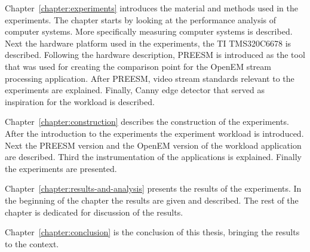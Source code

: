 Chapter~\ref{chapter:experiments} introduces the material and methods used in the experiments. The chapter starts by looking at the performance analysis of computer systems. More specifically measuring computer systems is described. Next the hardware platform used in the experiments, the TI TMS320C6678 is described. Following the hardware description, PREESM is introduced as the tool that was used for creating the comparison point for the OpenEM stream processing application. After PREESM, video stream standards relevant to the experiments are explained. Finally, Canny edge detector that served as inspiration for the workload is described.

Chapter~\ref{chapter:construction} describes the construction of the experiments. After the introduction to the experiments the experiment workload is introduced. Next the PREESM version and the OpenEM version of the workload application are described. Third the instrumentation of the applications is explained. Finally the experiments are presented.

Chapter~\ref{chapter:results-and-analysis} presents the results of the experiments. In the beginning of the chapter the results are given and described. The rest of the chapter is dedicated for discussion of the results.

Chapter~\ref{chapter:conclusion} is the conclusion of this thesis, bringing the results to the context.
